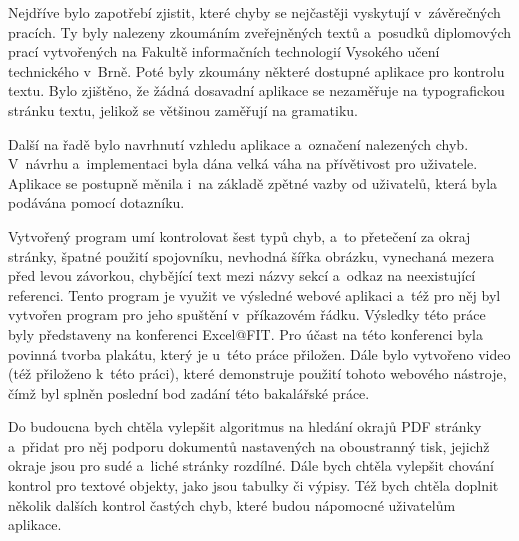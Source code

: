 Nejdříve bylo zapotřebí zjistit, které chyby se nejčastěji vyskytují v~závěrečných
pracích. Ty byly nalezeny zkoumáním zveřejněných textů a~posudků diplomových prací
vytvořených na Fakultě informačních technologií Vysokého učení technického v~Brně.
Poté byly zkoumány některé dostupné aplikace pro kontrolu textu. Bylo zjištěno,
že žádná dosavadní aplikace se nezaměřuje na typografickou stránku textu, jelikož
se většinou zaměřují na gramatiku.

Další na řadě bylo navrhnutí vzhledu aplikace a~označení nalezených chyb.
V~návrhu a~implementaci byla dána velká váha na přívětivost pro uživatele.
Aplikace se postupně měnila i~na základě zpětné vazby od uživatelů, která byla
podávána pomocí dotazníku.

Vytvořený program umí kontrolovat šest typů chyb, a~to přetečení za okraj stránky, 
špatné použití spojovníku, nevhodná šířka obrázku, vynechaná mezera před levou
závorkou, chybějící text mezi názvy sekcí a~odkaz na neexistující referenci.
Tento program je využit ve výsledné webové aplikaci a~též pro něj byl 
vytvořen program pro jeho spuštění v~příkazovém řádku.
Výsledky této práce byly představeny na konferenci Excel@FIT. Pro
účast na této konferenci byla povinná tvorba plakátu, který je u~této
práce přiložen.
Dále bylo vytvořeno video (též přiloženo k~této práci), které
demonstruje použití tohoto webového nástroje, čímž byl splněn poslední bod
zadání této bakalářské práce.

Do budoucna bych chtěla vylepšit algoritmus na hledání okrajů PDF stránky
a~přidat pro něj podporu dokumentů nastavených na oboustranný tisk, jejichž
okraje jsou pro sudé a~liché stránky rozdílné. Dále bych chtěla vylepšit chování
kontrol pro textové objekty, jako jsou tabulky či výpisy. Též bych chtěla doplnit
několik dalších kontrol častých chyb, které budou nápomocné uživatelům aplikace.






%
